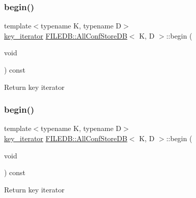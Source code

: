 \subsubsection{\texorpdfstring{begin()}{begin()}\hspace{0.1cm}{\footnotesize\ttfamily [1/2]}}
{\footnotesize\ttfamily template$<$typename K, typename D$>$ \\
\mbox{\hyperlink{classFILEDB_1_1AllConfStoreDB_a2ce8981ca7049ed0c2c6e438873a9c1b}{key\+\_\+iterator}} \mbox{\hyperlink{classFILEDB_1_1AllConfStoreDB}{F\+I\+L\+E\+D\+B\+::\+All\+Conf\+Store\+DB}}$<$ K, D $>$\+::begin (\begin{DoxyParamCaption}\item[{void}]{ }\end{DoxyParamCaption}) const\hspace{0.3cm}{\ttfamily [inline]}}

Return key iterator \mbox{\label{classFILEDB_1_1AllConfStoreDB_a7bb7f812d80471897860af5692eb5bd2}} 
\subsubsection{\texorpdfstring{begin()}{begin()}\hspace{0.1cm}{\footnotesize\ttfamily [2/2]}}
{\footnotesize\ttfamily template$<$typename K, typename D$>$ \\
\mbox{\hyperlink{classFILEDB_1_1AllConfStoreDB_a2ce8981ca7049ed0c2c6e438873a9c1b}{key\+\_\+iterator}} \mbox{\hyperlink{classFILEDB_1_1AllConfStoreDB}{F\+I\+L\+E\+D\+B\+::\+All\+Conf\+Store\+DB}}$<$ K, D $>$\+::begin (\begin{DoxyParamCaption}\item[{void}]{ }\end{DoxyParamCaption}) const\hspace{0.3cm}{\ttfamily [inline]}}

Return key iterator \mbox{\label{classFILEDB_1_1AllConfStoreDB_a213c914b326e7769411e305ceb375b1d}} 
